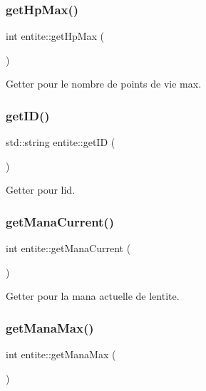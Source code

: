 \subsubsection{\texorpdfstring{get\+Hp\+Max()}{getHpMax()}}
{\footnotesize\ttfamily int entite\+::get\+Hp\+Max (\begin{DoxyParamCaption}{ }\end{DoxyParamCaption})}



Getter pour le nombre de points de vie max. 

\mbox{\label{classentite_a3af765474e7f288752f24334d0fc6bbd}} 
\subsubsection{\texorpdfstring{get\+I\+D()}{getID()}}
{\footnotesize\ttfamily std\+::string entite\+::get\+ID (\begin{DoxyParamCaption}{ }\end{DoxyParamCaption})}



Getter pour l\textquotesingle{}id. 

\mbox{\label{classentite_ad3e7a419d79d7d7e836243c4920703e3}} 
\subsubsection{\texorpdfstring{get\+Mana\+Current()}{getManaCurrent()}}
{\footnotesize\ttfamily int entite\+::get\+Mana\+Current (\begin{DoxyParamCaption}{ }\end{DoxyParamCaption})}



Getter pour la mana actuelle de l\textquotesingle{}entite. 

\mbox{\label{classentite_a427218420d74bdec1f79f93572ecf24a}} 
\subsubsection{\texorpdfstring{get\+Mana\+Max()}{getManaMax()}}
{\footnotesize\ttfamily int entite\+::get\+Mana\+Max (\begin{DoxyParamCaption}{ }\end{DoxyParamCaption})}



